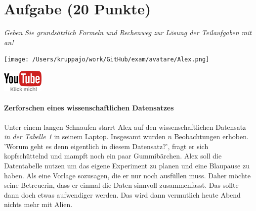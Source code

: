 \documentclass[a4paper, 9pt]{scrartcl}\usepackage[]{graphicx}\usepackage[]{xcolor}
\begin{document}
\section{Aufgabe \hfill (20 Punkte)}

\textit{Geben Sie grundsätzlich Formeln und Rechenweg zur Lösung der Teilaufgaben mit an!} \\[1Ex]
 

 
\ifcollection
\begin{flushright}
\tiny\vspace{-3Ex}
\textbf{\examinhaltstart}
\exammodulebiostat
\vspace{-4Ex}
\end{flushright}
\begin{minipage}[t]{0.5\textwidth}
\texttt{[image: /Users/kruppajo/work/GitHub/exam/avatare/Alex.png]}
\end{minipage}
\begin{minipage}[t]{0.5\textwidth}
\hfill
\href{https://youtu.be/0upJd61FI-c}{\includegraphics[width = 2cm]{img/youtube}}
\end{minipage}
\fi



\ifcollection
\paragraph{Zerforschen eines wissenschaftlichen Datensatzes}
\fi

Unter einem langen Schnaufen starrt Alex auf den wissenschaftlichen Datensatz \textit{in der Tabelle 1} in seinem Laptop. Insgesamt wurden $n$ Beobachtungen erhoben. 'Worum geht es denn eigentlich in diesem Datensatz?', fragt er sich kopfschüttelnd und mampft noch ein paar Gummibärchen. Alex soll die Datentabelle nutzen um das eigene Experiment zu planen und eine Blaupause zu haben. Als eine Vorlage sozusagen, die er nur noch ausfüllen muss. Daher möchte seine Betreuerin, dass er einmal die Daten sinnvoll zusammenfasst. Das sollte dann doch etwas aufwendiger werden. Das wird dann vermutlich heute Abend nichts mehr mit Alien.
\end{document}
